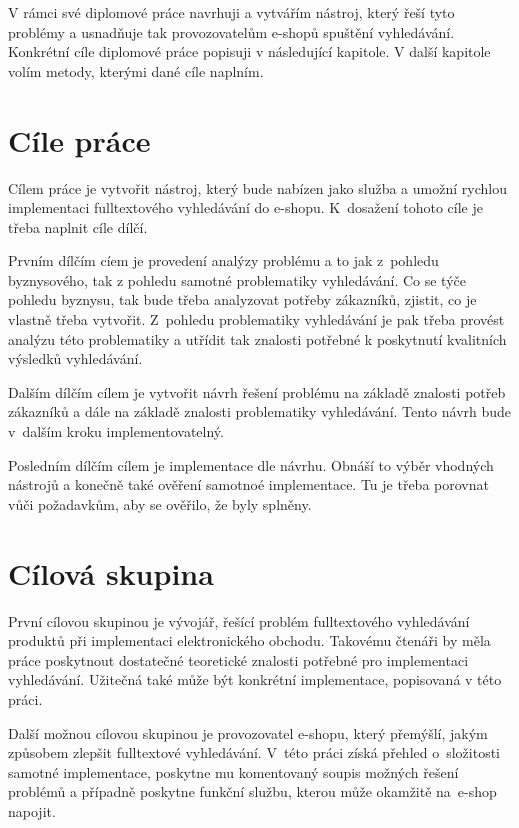 \documentclass[FM,DP]{tulthesis}
\begin{document}
V rámci své diplomové práce navrhuji a vytvářím nástroj, který řeší tyto problémy a 
usnadňuje tak provozovatelům e-shopů spuštění vyhledávání. Konkrétní cíle diplomové práce
popisuji v následující kapitole. V další kapitole volím metody, kterými dané cíle naplním.

\section{Cíle práce}

Cílem práce je vytvořit nástroj, který bude nabízen jako služba a umožní rychlou implementaci
fulltextového vyhledávání do e-shopu. K~dosažení tohoto cíle je třeba naplnit cíle dílčí.

Prvním dílčím cíem je provedení analýzy problému a to jak z~pohledu byznysového, tak
z pohledu samotné problematiky vyhledávání. Co se týče pohledu byznysu, tak bude třeba
analyzovat potřeby zákazníků, zjistit, co je vlastně třeba vytvořit. Z~pohledu
problematiky vyhledávání je pak třeba provést analýzu této problematiky a utřídit
tak znalosti potřebné k poskytnutí kvalitních výsledků vyhledávání.

Dalším dílčím cílem je vytvořit návrh řešení problému na základě znalosti potřeb
zákazníků a dále na základě znalosti problematiky vyhledávání. Tento návrh bude v~dalším 
kroku implementovatelný.

Posledním dílčím cílem je implementace dle návrhu. Obnáší to výběr vhodných nástrojů
a konečně také ověření samotnoé implementace. Tu je třeba porovnat vůči požadavkům, 
aby se ověřilo, že byly splněny.

\section{Cílová skupina}

První cílovou skupinou je vývojář, řešící problém fulltextového vyhledávání produktů 
při implementaci elektronického obchodu. Takovému čtenáři by měla práce poskytnout dostatečné
teoretické znalosti potřebné pro implementaci vyhledávání. Užitečná také může být konkrétní
implementace, popisovaná v této práci.

Další možnou cílovou skupinou je provozovatel e-shopu, který přemýšlí, jakým způsobem
zlepšit fulltextové vyhledávání. V~této práci získá přehled o~složitosti samotné implementace,
poskytne mu komentovaný soupis možných řešení problémů a případně poskytne funkční
službu, kterou může okamžitě na~e-shop napojit.
\end{document}

